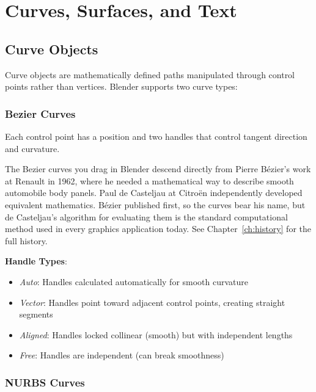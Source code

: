 \section{Curves, Surfaces, and Text}
\label{sec:curves}

\subsection{Curve Objects}
\label{sec:curveobjects}

Curve objects are mathematically defined paths manipulated through control points rather than vertices. Blender supports two curve types:

\subsubsection{Bezier Curves}

Each control point has a position and two handles that control tangent direction and curvature.

\begin{historynote}
The Bezier curves you drag in Blender descend directly from Pierre B\'{e}zier's work at Renault in 1962, where he needed a mathematical way to describe smooth automobile body panels. Paul de Casteljau at Citro\"{e}n independently developed equivalent mathematics. B\'{e}zier published first, so the curves bear his name, but de Casteljau's algorithm for evaluating them is the standard computational method used in every graphics application today. See Chapter~\ref{ch:history} for the full history.
\end{historynote}

\textbf{Handle Types}:
\begin{itemize}[leftmargin=2em]
  \item \textit{Auto}: Handles calculated automatically for smooth curvature
  \item \textit{Vector}: Handles point toward adjacent control points, creating straight segments
  \item \textit{Aligned}: Handles locked collinear (smooth) but with independent lengths
  \item \textit{Free}: Handles are independent (can break smoothness)
\end{itemize}

\subsubsection{NURBS Curves}

